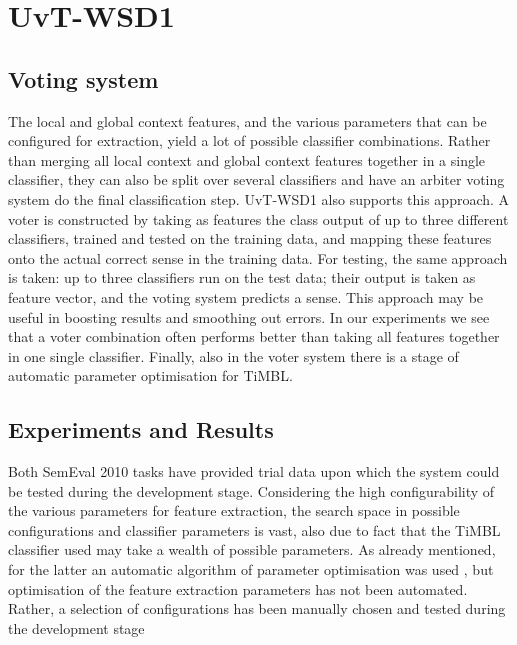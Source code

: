 \section{UvT-WSD1}

\subsection{Voting system}

The local and global context features, and the various parameters that can be
configured for extraction, yield a lot of possible classifier combinations.
Rather than merging all local context and global context features together in a
single classifier, they can also be split over several classifiers and have an
arbiter voting system do the final classification step. UvT-WSD1 also supports
this approach. A voter is constructed by taking as features the class output of
up to three different classifiers, trained and tested on the training data, and
mapping these features onto the actual correct sense in the training data. For
testing, the same approach is taken: up to three classifiers run on the test
data; their output is taken as feature vector, and the voting system predicts a
sense. This approach may be useful in boosting results and smoothing out
errors. In our experiments we see that a voter combination often performs
better than taking all features together in one single classifier. Finally,
also in the voter system there is a stage of automatic parameter optimisation
for TiMBL.

\subsection{Experiments and Results}

Both SemEval 2010 tasks have provided trial data upon which the system could be
tested during the development stage. Considering the high configurability of
the various parameters for feature extraction, the search space in possible
configurations and classifier parameters is vast, also due to fact that the
TiMBL classifier used may take a wealth of possible parameters. As already
mentioned, for the latter an automatic algorithm of parameter optimisation was
used \citep{PARAMSEARCH}, but optimisation of the feature extraction parameters
has not been automated. Rather, a selection of configurations has been manually
chosen and tested during the development stage


